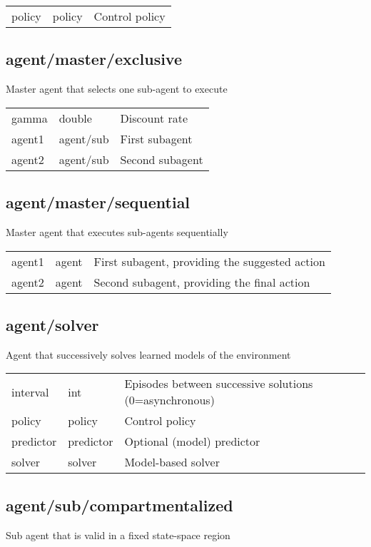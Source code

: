 \noindent\begin{tabular}{@{}lll@{}}
policy&policy&Control policy\\
\end{tabular}
\subsection{agent/master/exclusive}
\noindent Master agent that selects one sub-agent to execute\\

\noindent\begin{tabular}{@{}lll@{}}
gamma&double&Discount rate\\
agent1&agent/sub&First subagent\\
agent2&agent/sub&Second subagent\\
\end{tabular}
\subsection{agent/master/sequential}
\noindent Master agent that executes sub-agents sequentially\\

\noindent\begin{tabular}{@{}lll@{}}
agent1&agent&First subagent, providing the suggested action\\
agent2&agent&Second subagent, providing the final action\\
\end{tabular}
\subsection{agent/solver}
\noindent Agent that successively solves learned models of the environment\\

\noindent\begin{tabular}{@{}lll@{}}
interval&int&Episodes between successive solutions (0=asynchronous)\\
policy&policy&Control policy\\
predictor&predictor&Optional (model) predictor\\
solver&solver&Model-based solver\\
\end{tabular}
\subsection{agent/sub/compartmentalized}
\noindent Sub agent that is valid in a fixed state-space region\\


